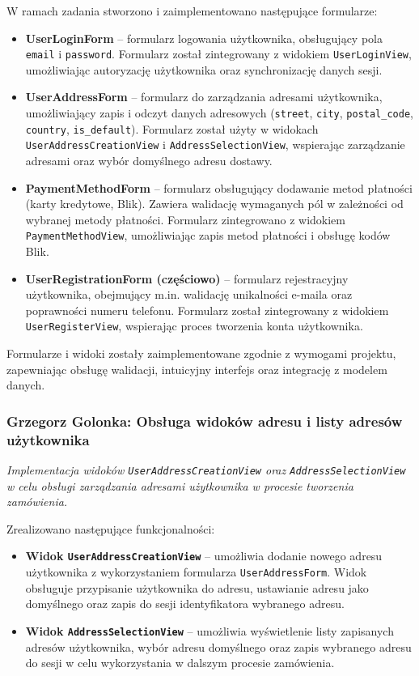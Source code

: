 \documentclass[12pt,a4paper,oneside]{article}
\theoremstyle{definition}
\numberwithin{equation}{section}
\begin{document}
W ramach zadania stworzono i zaimplementowano następujące formularze:
\begin{itemize}
    \item \textbf{UserLoginForm} – formularz logowania użytkownika, obsługujący pola \texttt{email} i \texttt{password}. Formularz został zintegrowany z widokiem \texttt{UserLoginView}, umożliwiając autoryzację użytkownika oraz synchronizację danych sesji.
    \item \textbf{UserAddressForm} – formularz do zarządzania adresami użytkownika, umożliwiający zapis i odczyt danych adresowych (\texttt{street}, \texttt{city}, \texttt{postal\_code}, \texttt{country}, \texttt{is\_default}). Formularz został użyty w widokach \texttt{UserAddressCreationView} i \texttt{AddressSelectionView}, wspierając zarządzanie adresami oraz wybór domyślnego adresu dostawy.
    \item \textbf{PaymentMethodForm} – formularz obsługujący dodawanie metod płatności (karty kredytowe, Blik). Zawiera walidację wymaganych pól w zależności od wybranej metody płatności. Formularz zintegrowano z widokiem \texttt{PaymentMethodView}, umożliwiając zapis metod płatności i obsługę kodów Blik.
    \item \textbf{UserRegistrationForm (częściowo)} – formularz rejestracyjny użytkownika, obejmujący m.in. walidację unikalności e-maila oraz poprawności numeru telefonu. Formularz został zintegrowany z widokiem \texttt{UserRegisterView}, wspierając proces tworzenia konta użytkownika.
\end{itemize}

Formularze i widoki zostały zaimplementowane zgodnie z wymogami projektu, zapewniając obsługę walidacji, intuicyjny interfejs oraz integrację z modelem danych.
%
%
\subsubsection{Grzegorz Golonka: Obsługa widoków adresu i listy adresów użytkownika}
\label{section:1.3.24}
\textit{
Implementacja widoków \texttt{UserAddressCreationView} oraz \texttt{AddressSelectionView} w celu obsługi zarządzania adresami użytkownika w procesie tworzenia zamówienia.
}

Zrealizowano następujące funkcjonalności:
\begin{itemize}
    \item \textbf{Widok \texttt{UserAddressCreationView}} – umożliwia dodanie nowego adresu użytkownika z wykorzystaniem formularza \texttt{UserAddressForm}. Widok obsługuje przypisanie użytkownika do adresu, ustawianie adresu jako domyślnego oraz zapis do sesji identyfikatora wybranego adresu.
    \item \textbf{Widok \texttt{AddressSelectionView}} – umożliwia wyświetlenie listy zapisanych adresów użytkownika, wybór adresu domyślnego oraz zapis wybranego adresu do sesji w celu wykorzystania w dalszym procesie zamówienia.
\end{itemize}
\end{document}
